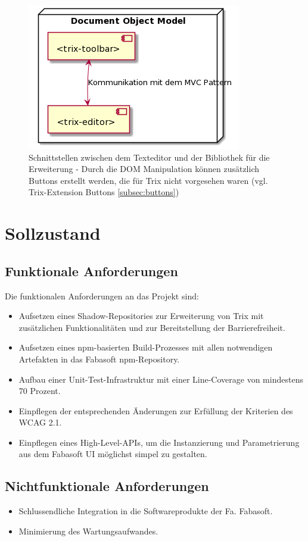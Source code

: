 \begin{figure}[H]
\begin{center}
	\includegraphics[scale=.6]{images/trix_components.png}
\end{center}
	\caption{Schnittstellen zwischen dem Texteditor und der Bibliothek für die Erweiterung - Durch die DOM Manipulation können zusätzlich Buttons erstellt werden, die für Trix nicht vorgesehen waren (vgl. Trix-Extension Buttons \ref{subsec:buttons})}
\end{figure}

\section{Sollzustand}

\subsection{Funktionale Anforderungen}
Die funktionalen Anforderungen an das Projekt sind:

\begin{itemize}
	\item{Aufsetzen eines Shadow-Repositories zur Erweiterung von Trix mit zusätzlichen Funktionalitäten und zur Bereitstellung der Barrierefreiheit.}
	\item{Aufsetzen eines npm-basierten Build-Prozesses mit allen notwendigen Artefakten in 
das Fabasoft npm-Repository.}
	\item{Aufbau einer Unit-Test-Infrastruktur mit einer Line-Coverage von mindestens 70 
Prozent.}
	\item{Einpflegen der entsprechenden Änderungen zur Erfüllung der Kriterien des WCAG 2.1.}
	\item{Einpflegen eines High-Level-APIs, um die Instanzierung und Parametrierung aus dem 
Fabasoft UI möglichst simpel zu gestalten.}
\end{itemize}

\subsection{Nichtfunktionale Anforderungen}

\begin{itemize}
	\item{Schlussendliche Integration in die Softwareprodukte der Fa. Fabasoft.}
	\item{Minimierung des Wartungsaufwandes.}
\end{itemize}